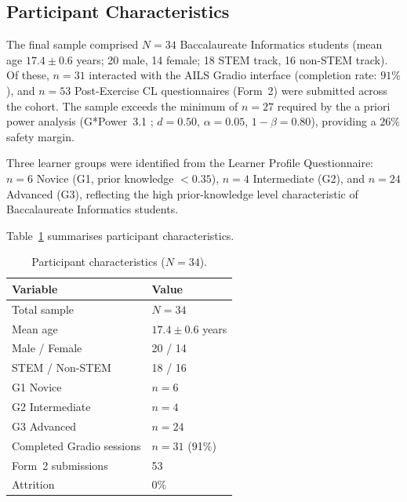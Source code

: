 \documentclass[ASNA,twocolumn]{USG} %
\begin{document}
\subsection{Participant Characteristics}
\label{sec:participants}

The final sample comprised $N{=}34$ Baccalaureate Informatics
students (mean age $17.4{\pm}0.6$ years; 20 male, 14 female;
18 STEM track, 16 non-STEM track).
Of these, $n{=}31$ interacted with the AILS Gradio interface
(completion rate: $91\%$), and $n{=}53$ Post-Exercise CL
questionnaires (Form~2) were submitted across the cohort.
The sample exceeds the minimum of $n{=}27$ required by the
a priori power analysis (G*Power~3.1 \cite{Faul2007};
$d{=}0.50$, $\alpha{=}0.05$, $1{-}\beta{=}0.80$), providing
a $26\%$ safety margin.

Three learner groups were identified from the Learner Profile
Questionnaire: $n{=}6$ Novice (G1, prior knowledge
$< 0.35$), $n{=}4$ Intermediate (G2), and $n{=}24$ Advanced
(G3), reflecting the high prior-knowledge level characteristic
of Baccalaureate Informatics students.

Table~\ref{tab:participants} summarises participant
characteristics.

\begin{table}[ht]
\caption{Participant characteristics ($N{=}34$).}
\label{tab:participants}
\begin{tabular*}{\hsize}{@{\extracolsep{\fill}}ll@{}}
\toprule
\textbf{Variable} & \textbf{Value} \\
\midrule
Total sample              & $N = 34$ \\
Mean age                  & $17.4 \pm 0.6$ years \\
Male / Female             & 20 / 14 \\
STEM / Non-STEM           & 18 / 16 \\
G1 Novice                 & $n = 6$ \\
G2 Intermediate           & $n = 4$ \\
G3 Advanced               & $n = 24$ \\
Completed Gradio sessions & $n = 31$ (91\%) \\
Form~2 submissions        & 53 \\
Attrition                 & 0\% \\
\bottomrule
\end{tabular*}
\end{table}
\end{document}

